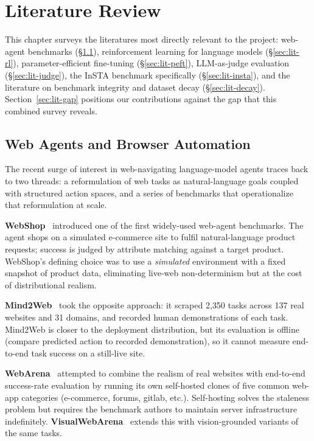 \documentclass[12pt,a4paper]{report}
\begin{document}
\chapter{Literature Review}\label{chap:litreview}

This chapter surveys the literatures most directly relevant to the project: web-agent benchmarks (\S\ref{sec:lit-webagents}), reinforcement learning for language models (\S\ref{sec:lit-rl}), parameter-efficient fine-tuning (\S\ref{sec:lit-peft}), LLM-as-judge evaluation (\S\ref{sec:lit-judge}), the InSTA benchmark specifically (\S\ref{sec:lit-insta}), and the literature on benchmark integrity and dataset decay (\S\ref{sec:lit-decay}). Section~\ref{sec:lit-gap} positions our contributions against the gap that this combined survey reveals.

\section{Web Agents and Browser Automation}\label{sec:lit-webagents}

The recent surge of interest in web-navigating language-model agents traces back to two threads: a reformulation of web tasks as natural-language goals coupled with structured action spaces, and a series of benchmarks that operationalize that reformulation at scale.

\textbf{WebShop}~\cite{yao2022webshop} introduced one of the first widely-used web-agent benchmarks. The agent shops on a simulated e-commerce site to fulfil natural-language product requests; success is judged by attribute matching against a target product. WebShop's defining choice was to use a \emph{simulated} environment with a fixed snapshot of product data, eliminating live-web non-determinism but at the cost of distributional realism.

\textbf{Mind2Web}~\cite{deng2023mind2web} took the opposite approach: it scraped 2{,}350 tasks across 137 real websites and 31 domains, and recorded human demonstrations of each task. Mind2Web is closer to the deployment distribution, but its evaluation is offline (compare predicted action to recorded demonstration), so it cannot measure end-to-end task success on a still-live site.

\textbf{WebArena}~\cite{zhou2023webarena} attempted to combine the realism of real websites with end-to-end success-rate evaluation by running its own self-hosted clones of five common web-app categories (e-commerce, forums, gitlab, etc.). Self-hosting solves the staleness problem but requires the benchmark authors to maintain server infrastructure indefinitely. \textbf{VisualWebArena}~\cite{koh2024visualwebarena} extends this with vision-grounded variants of the same tasks.
\end{document}

